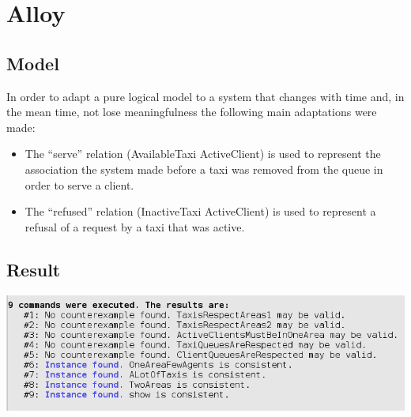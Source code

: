 \documentclass{article}
\begin{document}
\section{Alloy}
\subsection{Model}
In order to adapt a pure logical model to a system that changes with time and, in the mean time, not lose meaningfulness the following
main adaptations were made:
\begin{itemize}
	\item The ``serve'' relation (AvailableTaxi \textrightarrow\-ActiveClient) is used to represent the association the system made before a taxi was removed from the queue in order to serve a client.
	\item The ``refused'' relation (InactiveTaxi \textrightarrow\-ActiveClient) is used to represent a refusal of a request by a taxi that was active.
\end{itemize}
\texttt{}	
\subsection{Result}
\begin{center}
	\includegraphics[width=.9\textwidth,height=.9\textheight,keepaspectratio]{Alloy/AlloyChecks}
\end{center}
\end{document}

